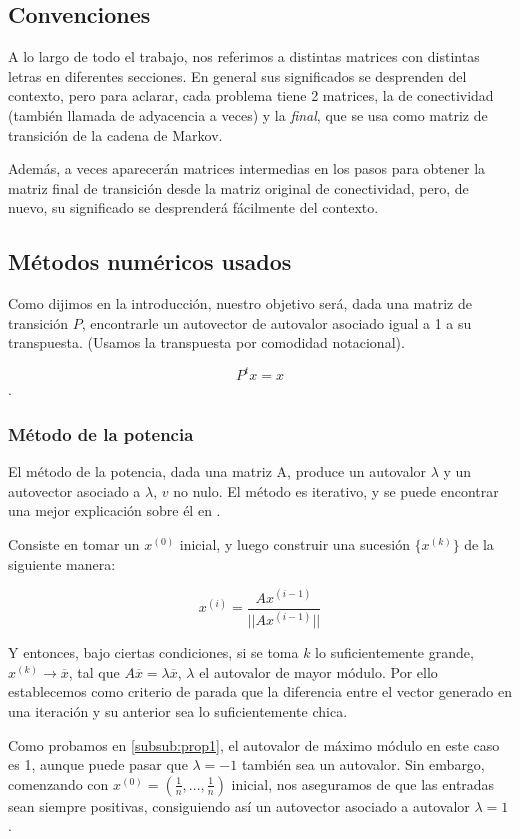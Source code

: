 \subsection{Convenciones}

A lo largo de todo el trabajo, nos referimos a distintas matrices con distintas letras en diferentes secciones. En general sus significados se desprenden del contexto, pero para aclarar, cada problema tiene 2 matrices, la de conectividad (también llamada de adyacencia a veces) y la \emph{final}, que se usa como matriz de transición de la cadena de Markov.

Además, a veces aparecerán matrices intermedias en los pasos para obtener la matriz final de transición desde la matriz original de conectividad, pero, de nuevo, su significado se desprenderá fácilmente del contexto.


\subsection{Métodos numéricos usados}

Como dijimos en la introducción, nuestro objetivo será, dada una matriz de transición $P$, encontrarle un autovector de autovalor asociado igual a 1 a su transpuesta. (Usamos la transpuesta por comodidad notacional).

\[P^t x = x\].


\subsubsection{Método de la potencia}
El método de la potencia, dada una matriz A, produce un autovalor $\lambda$ y un autovector asociado a $\lambda$, $v$ no nulo. El método es iterativo, y se puede encontrar una mejor explicación sobre él en \cite[Cap. 5.8.1]{dahlquist}. 

Consiste en tomar un $x^{(0)}$ inicial, y luego construir una sucesión $\{x^{(k)}\}$ de la siguiente manera:

\[x^{(i)} = \frac{A x^{(i-1)}}{||A x^{(i-1)}||}\]

Y entonces, bajo ciertas condiciones, si se toma $k$ lo suficientemente grande, $x^{(k)} \to \overline{x}$, tal que $A\overline{x} = \lambda \overline{x}$, $\lambda$ el autovalor de mayor módulo. Por ello establecemos como criterio de parada que la diferencia entre el vector generado en una iteración y su anterior sea lo suficientemente chica.

Como probamos en \ref{subsub:prop1}, el autovalor de máximo módulo en este caso es 1, aunque puede pasar que $\lambda = -1$ también sea un autovalor. Sin embargo, comenzando con $x^{(0)} = (\frac1n,..., \frac1n)$ inicial, nos aseguramos de que las entradas sean siempre positivas, consiguiendo así un autovector asociado a autovalor $\lambda = 1$.

